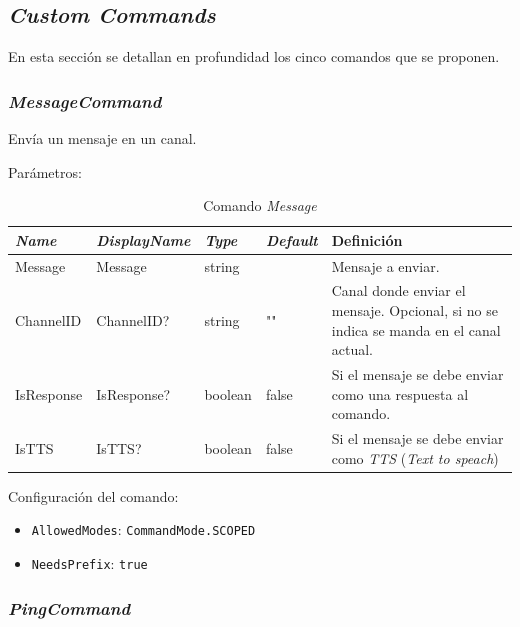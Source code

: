 \subsection{\textit{Custom Commands}}

En esta sección se detallan en profundidad los cinco comandos que se proponen.

\subsubsection{\textit{MessageCommand}}

Envía un mensaje en un canal.

Parámetros:

\begin{table}[H]
    \centering
    \def\arraystretch{1.25}
    \begin{adjustbox}{max width=\textwidth}
    \begin{tabularx}{\textwidth}{|l|l|l|l|L|}
    \hline
        \textbf{\textit{Name}} & \textbf{\textit{DisplayName}} & \textbf{\textit{Type}} & \textbf{\textit{Default}} & \textbf{Definición} \\ \hline
    \hline
        Message & Message & string & ~ & Mensaje a enviar. \\ \hline
        ChannelID & ChannelID? & string & "" & Canal donde enviar el mensaje. Opcional, si no se indica se manda en el canal actual. \\ \hline
        IsResponse & IsResponse? & boolean & false & Si el mensaje se debe enviar como una respuesta al comando. \\ \hline
        IsTTS & IsTTS? & boolean & false & Si el mensaje se debe enviar como \textit{TTS} (\textit{Text to speach}) \\ \hline
    \end{tabularx}
    \end{adjustbox}
    \caption{Comando \textit{Message}}
\end{table}

Configuración del comando:

\begin{itemize}
	\item \verb|AllowedModes|: \verb|CommandMode.SCOPED|
	\item \verb|NeedsPrefix|: \verb|true|
\end{itemize}


\subsubsection{\textit{PingCommand}}

